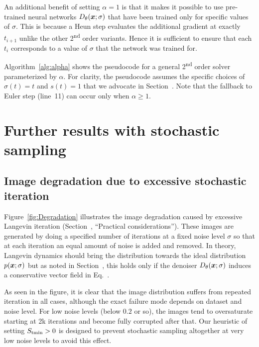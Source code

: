 An additional benefit of setting $\alpha=1$ is that it makes it possible to use pre-trained neural networks $D_\theta(\boldsymbol{x};\sigma)$ that have been trained only for specific values of $\sigma$.
This is because a Heun step evaluates the additional gradient at exactly $t_{i+1}$ unlike the other 2\textsuperscript{nd} order variants.
Hence it is sufficient to ensure that each $t_i$ corresponds to a value of $\sigma$ that the network was trained for.

\algAlpha

Algorithm~\ref{alg:alpha} shows the pseudocode for a general 2\textsuperscript{nd} order solver parameterized by $\alpha$.
For clarity, the pseudocode assumes the specific choices of $\sigma(t)=t$ and $s(t)=1$ that we advocate in Section~.
Note that the fallback to Euler step (line~11) can occur only when $\alpha \ge 1$.

\section{Further results with stochastic sampling}
\label{app:stochastic}

\subsection{Image degradation due to excessive stochastic iteration}
\label{app:degradation}

\figDegradation

Figure~\ref{fig:Degradation} illustrates the image degradation caused by excessive Langevin iteration (Section~, ``Practical considerations'').
These images are generated by doing a specified number of iterations at a fixed noise level $\sigma$ so that at each iteration an equal amount of noise is added and removed.
In theory, Langevin dynamics should bring the distribution towards the ideal distribution $p(\boldsymbol{x};\sigma)$ but as noted in Section~, 
  this holds only if the denoiser $D_\theta(\boldsymbol{x};\sigma)$ induces a conservative vector field in Eq.~.

As seen in the figure, it is clear that the image distribution suffers from repeated iteration in all cases, although the exact failure mode depends on dataset and noise level.
For low noise levels (below $0.2$ or so), the images tend to oversaturate starting at 2k iterations and become fully corrupted after that.
Our heuristic of setting $S_\text{tmin} > 0$ is designed to prevent stochastic sampling altogether at very low noise levels to avoid this effect.

